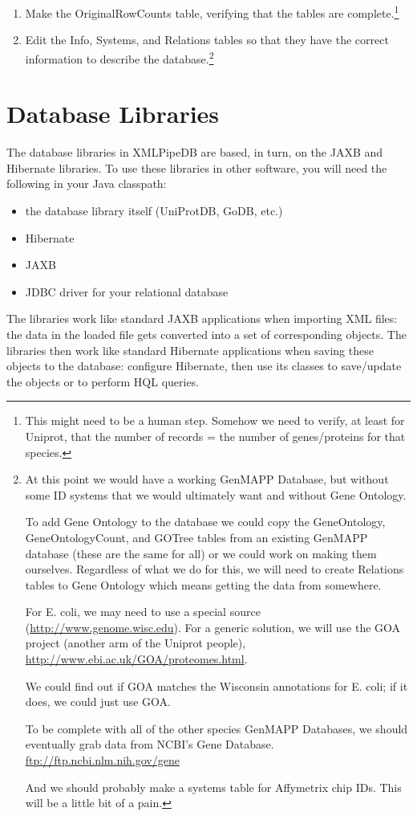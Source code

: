 \documentclass[11pt]{article}
\begin{document}
\begin{enumerate}
\item Make the OriginalRowCounts table, verifying that the tables are complete.\footnote{This might need to be a human step.  Somehow we need to verify, at least for Uniprot, that the number of records = the number of genes/proteins for that species.}

\item Edit the Info, Systems, and Relations tables so that they have the correct information to describe the database.\footnote{
At this point we would have a working GenMAPP Database, but without some ID systems that we would ultimately want and without Gene Ontology.

To add Gene Ontology to the database we could copy the GeneOntology, GeneOntologyCount, and GOTree tables from an existing GenMAPP database (these are the same for all) or we could work on making them ourselves.  Regardless of what we do for this, we will need to create Relations tables to Gene Ontology which means getting the data from somewhere.

For E. coli, we may need to use a special source (\url{http://www.genome.wisc.edu}).  For a generic solution, we will use the GOA project (another arm of the Uniprot people), \url{http://www.ebi.ac.uk/GOA/proteomes.html}.

We could find out if GOA matches the Wisconsin annotations for E. coli; if it does, we could just use GOA.

To be complete with all of the other species GenMAPP Databases, we should eventually grab data from NCBI's Gene Database.  \url{ftp://ftp.ncbi.nlm.nih.gov/gene}

And we should probably make a systems table for Affymetrix chip IDs.  This will be a little bit of a pain.}
\end{enumerate}

\section{Database Libraries}
\label{dblib}

The database libraries in XMLPipeDB are based, in turn, on the JAXB and Hibernate libraries.  To use these libraries in other software, you will need the following in your Java classpath:
\begin{itemize}
\item the database library itself (UniProtDB, GoDB, etc.)
\item Hibernate
\item JAXB
\item JDBC driver for your relational database
\end{itemize}
The libraries work like standard JAXB applications when importing XML files: the data in the loaded file gets converted into a set of corresponding objects.  The libraries then work like standard Hibernate applications when saving these objects to the database: configure Hibernate, then use its classes to save/update the objects or to perform HQL queries.
\end{document}
